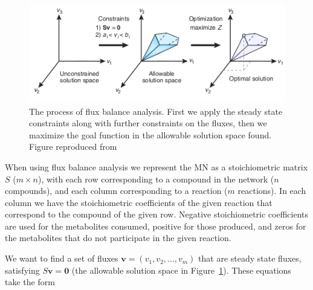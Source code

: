 \documentclass[a4paper,12pt]{article}
\begin{document}
	\begin{figure}[htpb]
		\centering
		\includegraphics[width=0.8\linewidth]{fba_frompaper.png}
		\caption{The process of flux balance analysis. First we apply the steady state constraints along with further constraints on the fluxes, then we maximize the goal function in the allowable solution space found. Figure reproduced from \cite[]{whatisfluxbalance} }
		\label{fig:fluxbalance}
	\end{figure}

	When using flux balance analysis we represent the MN as a stoichiometric matrix $S$ ($m\times n$), with each row corresponding to a compound in the network ($n$ compounds), and each column corresponding to a reaction ($m$ reactions). In each column we have the stoichiometric coefficients of the given reaction that correspond to the compound of the given row. Negative stoichiometric coefficients are used for the metabolites consumed, positive for those produced, and zeros for the metabolites that do not participate in the given reaction.
	
	We want to find a set of fluxes  $\mathbf{v}=\left( v_1,v_2,...,v_m \right)$ that are steady state fluxes, satisfying $S\mathbf{v}=\mathbf{0}$ (the allowable solution space in Figure~\ref{fig:fluxbalance}). These equations take the form
	
\end{document}
